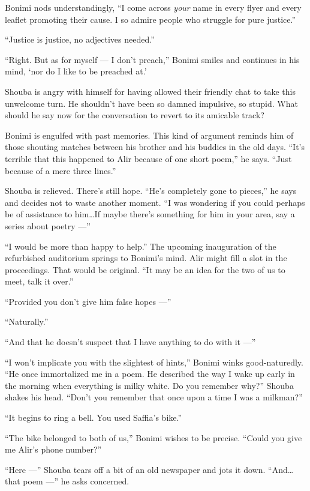 \documentclass[twoside,11pt,openany]{book}
\begin{document}
Bonimi nods understandingly, ``I come across \textit{your }name in every flyer and every leaflet promoting
their cause. I so admire people who struggle for pure justice.''

``Justice is justice, no adjectives needed.''

``Right. But as for myself --- I don't preach,'' Bonimi smiles and continues in his mind, `nor
do I like to be preached at.'

Shouba is angry with himself for having allowed their friendly chat to take this unwelcome turn. He shouldn't have been
so damned impulsive, so stupid. What should he say now for the conversation to revert to its amicable track?

Bonimi is engulfed with past memories. This kind of argument reminds him of those shouting matches between his brother
and his buddies in the old days. ``It's terrible that this happened to Alir because of one
short poem,''  he says. ``Just because of{ }{a }mere three lines.''

Shouba is relieved. There's still hope. ``He's completely gone to pieces,'' he says and
decides not to waste another moment. ``I was wondering if you could perhaps be of assistance to
him{\ldots}If maybe there's something for him in your area, say a series about poetry ---''

``I would be more than happy to help.''  The upcoming inauguration of the refurbished
auditorium springs to Bonimi's mind. Alir might fill a slot in the proceedings. That would be original.
``It may be an idea for the two of us to meet, talk it over.''

``Provided you don't give him false hopes ---''

``Naturally.''

``And that he doesn't suspect that I have anything to do with it ---''

``I won't implicate you with the slightest of hints,'' Bonimi winks good-naturedly.
``He once immortalized me in a poem. He described the way I wake up early in the morning when everything
is milky white. Do you remember why?'' Shouba shakes his head. ``Don't you remember that once
upon a time I was a milkman?''

``It begins to ring a bell. You used Saffia's bike.''

``The bike belonged to both of us,'' Bonimi wishes to be precise. ``Could you
give me Alir's phone number?''

``Here ---'' Shouba tears off {a bit of an }old newspaper and jots it
down.  ``And{\ldots}that poem ---'' he asks concerned.
\end{document}
